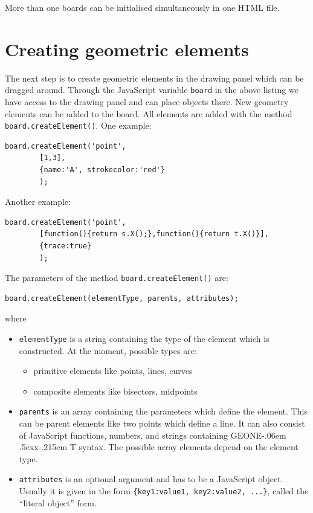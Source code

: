 \documentclass[a4paper,nols]{tufte-book}
\def\geonext{GEONE\kern-.06em \lower.5ex\hbox{x}\kern-.215em T}
\begin{document}
More than one boards can be initialised simultaneously in one HTML file. 
\chapter{Creating geometric elements}

The next step is to create geometric elements in the drawing panel which can be 
dragged around.
Through the JavaScript variable \lstinline|board| in the above listing we have access to the drawing panel 
and can place objects there. New geometry elements can be added to the board. 
All elements are added with the method \lstinline|board.createElement()|. One example:
\begin{lstlisting}
board.createElement('point', 
        [1,3], 
        {name:'A', strokecolor:'red'}
        );
\end{lstlisting}
Another example:
\begin{lstlisting}
board.createElement('point', 
        [function(){return s.X();},function(){return t.X()}], 
        {trace:true}
        );
\end{lstlisting}
The parameters of the method \lstinline|board.createElement()| are:
\begin{lstlisting}
board.createElement(elementType, parents, attributes);
\end{lstlisting}
where
\begin{itemize}
    \item \lstinline|elementType| is a string containing the type of the element which is constructed. 
       At the moment, possible types are:
        \begin{itemize}
          \item primitive elements like points, lines, curves
          \item composite elements like bisectors, midpoints 
        \end{itemize}
    \item \lstinline|parents| is an array containing the parameters which define the element. 
    This can be parent elements like two points which define a line. It can also consist of JavaScript functions, numbers, and strings containing \geonext{} syntax. The possible array elements depend on the element type.
    \item \lstinline|attributes| is an optional argument and has to be a JavaScript object. 
    Usually it is given in the form 
    \lstinline|{key1:value1, key2:value2, ...}|, called the ``literal object'' form.
\end{itemize}
\end{document}
